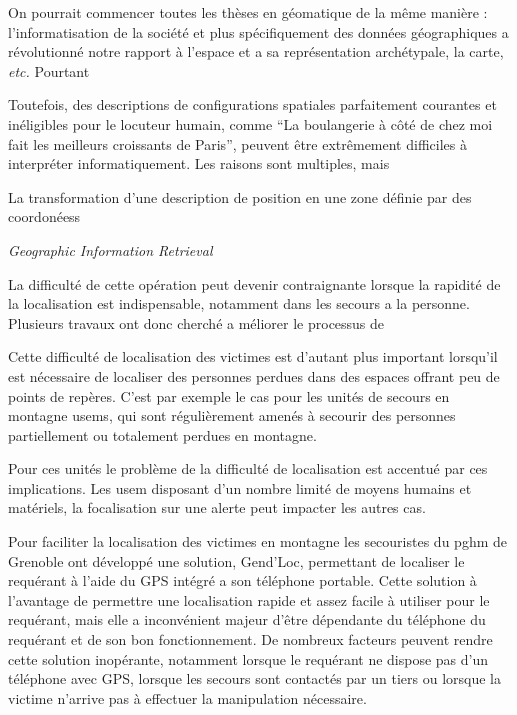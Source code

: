 On pourrait commencer toutes les thèses en géomatique de la même
manière : l'informatisation de la société et plus spécifiquement des
données géographiques a révolutionné notre rapport à l'espace et a sa
représentation archétypale, la carte, \emph{etc.} Pourtant 

Toutefois, des descriptions de configurations spatiales parfaitement
courantes et inéligibles pour le locuteur humain, comme \enquote{La
  boulangerie à côté de chez moi fait les meilleurs croissants de
  Paris}, peuvent être extrêmement difficiles à interpréter
informatiquement. Les raisons sont multiples, mais 



La transformation d'une description de position en une zone définie
par des coordonéess

\emph{Geographic Information Retrieval} \autocite{Jones2008}



La difficulté de cette opération peut devenir contraignante
lorsque la rapidité de la localisation est indispensable, notamment
dans les secours a la personne. Plusieurs travaux ont donc cherché a
méliorer le processus de 

\autocite{DosSantosFerreria2019} 

Cette difficulté de localisation des victimes est d'autant plus
important lorsqu'il est nécessaire de localiser des personnes perdues
dans des espaces offrant peu de points de repères. C'est par exemple
le cas pour les unités de secours en montagne \acp{usem}, qui sont
régulièrement amenés à secourir des personnes partiellement ou
totalement perdues en montagne.

Pour ces unités le problème de la difficulté de localisation est
accentué par ces implications. Les \ac{usem} disposant d'un nombre
limité de moyens humains et matériels, la focalisation sur une alerte
peut impacter les autres cas.

Pour faciliter la localisation des victimes en montagne les
secouristes du \ac{pghm} de Grenoble ont développé une solution,
Gend'Loc, permettant de localiser le requérant à l'aide du GPS intégré
a son téléphone portable. Cette solution à l'avantage de permettre une
localisation rapide et assez facile à utiliser pour le requérant, mais
elle a inconvénient majeur d'être dépendante du téléphone du requérant
et de son bon fonctionnement. De nombreux facteurs peuvent rendre
cette solution inopérante, notamment lorsque le requérant ne dispose
pas d'un téléphone avec GPS, lorsque les secours sont contactés par un
tiers ou lorsque la victime n'arrive pas à effectuer la manipulation
nécessaire.

